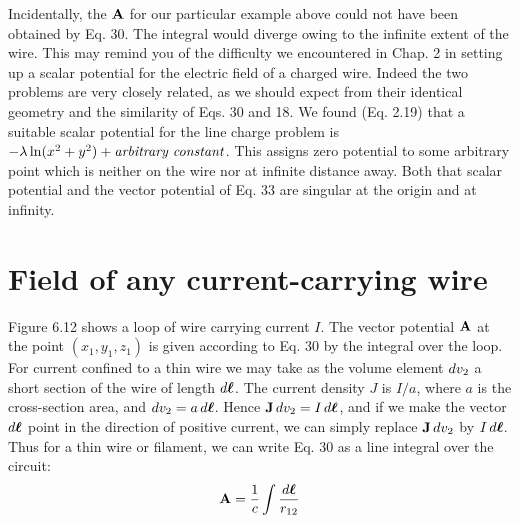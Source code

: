 Incidentally, the $\mathbf{A}$ for our particular example above could not
have been obtained by Eq. 30. The integral would diverge owing to
the infinite extent of the wire. This may remind you of the difficulty
we encountered in Chap. 2 in setting up a scalar potential for the
electric field of a charged wire. Indeed the two problems are very
closely related, as we should expect from their identical geometry
and the similarity of Eqs. 30 and 18. We found (Eq. 2.19) that a suitable
scalar potential for the line charge problem
is $-\lambda\ln(x^2+y^2)+\text{\emph{arbitrary constant}}$.
This assigns zero potential to some arbitrary
point which is neither on the wire nor at infinite distance away. Both
that scalar potential and the vector potential of Eq. 33 are singular
at the origin and at infinity.


\section{Field of any current-carrying wire}

Figure 6.12 shows a loop of wire carrying current $I$. The vector
potential $\mathbf{A}$ at the point $(x_1,y_1,z_1)$ is given according to Eq. 30 by the
integral over the loop. For current confined to a thin wire we may
take as the volume element $\mathop{d\!} v_2$ a short section of the wire of length $\mathop{d\!}\boldsymbol{\ell}$.
The current density $J$ is $I/a$, where $a$ is the cross-section area, and
$\mathop{d\!} v_2 = a \mathop{d\!}\boldsymbol{\ell}$. Hence $\mathbf{J}\mathop{d\!} v_2 = I\mathop{d\!}\boldsymbol{\ell}$, and if 
we make the vector $\mathop{d\!}\boldsymbol{\ell}$ point
in the direction of positive current, we can simply replace $\mathbf{J}\mathop{d\!} v_2$ by
$I\mathop{d\!}\boldsymbol{\ell}$. Thus for a thin wire or filament, we can write Eq. 30 as a line
integral over the circuit:
\begin{equation}
  \mathbf{A} = \frac{1}{c} \int \frac{\mathop{d\!}\boldsymbol{\ell}}{r_{12}}
\end{equation}


